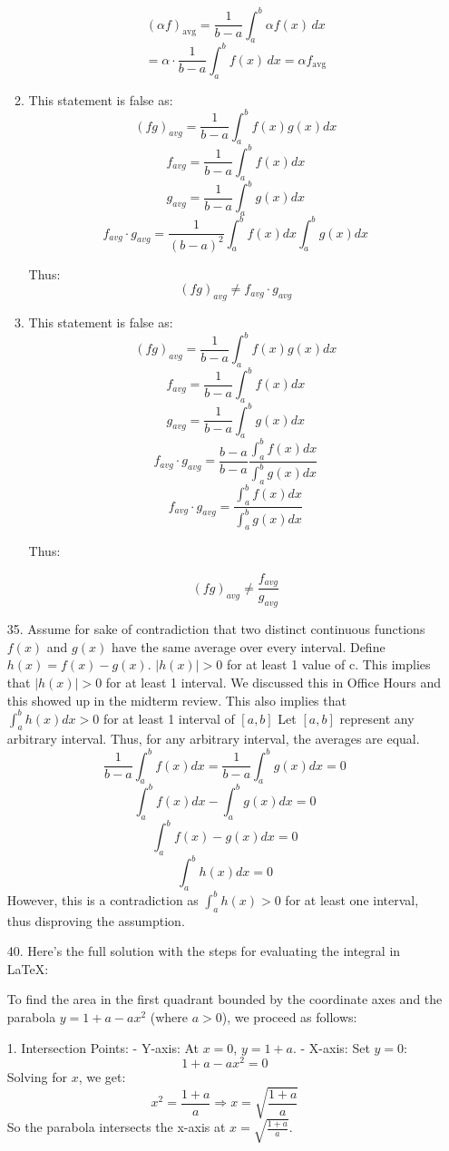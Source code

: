 \documentclass[12pt]{article}
\begin{document}
\begin{enumerate}[start=1,label={\bfseries. },leftmargin=1in]
\begin{enumerate}
\[
(\alpha f)_{\text{avg}} = \frac{1}{b - a} \int_a^b \alpha f(x) \, dx 
\]
\[
= \alpha \cdot \frac{1}{b - a} \int_a^b f(x) \, dx = \alpha f_{\text{avg}}
\]

\item This statement is false as:
\[
(fg)_{avg} = \frac{1}{b - a} \int_a^b f(x) g(x)dx
\]
\[
f_{avg} = \frac{1}{b - a} \int_a^b f(x)dx
\]
\[
g_{avg} = \frac{1}{b - a} \int_a^b g(x)dx
\]
\[
f_{avg}\cdot g_{avg} = \frac{1}{(b-a)^2}\int_a^b f(x)dx\int_a^b g(x)dx
\]

Thus: 
\[
(fg)_{avg} \neq f_{avg}\cdot g_{avg}
\]


\item This statement is false as:
\[
(fg)_{avg} = \frac{1}{b - a} \int_a^b f(x) g(x)dx
\]
\[
f_{avg} = \frac{1}{b - a} \int_a^b f(x)dx
\]
\[
g_{avg} = \frac{1}{b - a} \int_a^b g(x)dx
\]
\[
f_{avg}\cdot g_{avg} = \frac{b-a}{b-a}\frac{\int_a^b f(x)dx}{\int_a^b g(x)dx}
\]
\[
f_{avg}\cdot g_{avg} = \frac{\int_a^b f(x)dx}{\int_a^b g(x)dx}
\]

Thus:

\[
(fg)_{avg} \neq \frac{f_{avg}}{g_{avg}}
\]


\end{enumerate}

\item [35. ]
Assume for sake of contradiction that two distinct continuous functions $f(x)$ and $g(x)$ have the same average over every interval. Define $h(x) = f(x) - g(x)$. $|h(x)| > 0$ for at least 1 value of c. This implies that $|h(x)| > 0 $ for at least 1 interval. We discussed this in Office Hours and this showed up in the midterm review. This also implies that $\int_{a}^b h(x)dx > 0$ for at least 1 interval of $[a,b]$
Let $[a,b]$ represent any arbitrary interval. Thus, for any arbitrary interval, the averages are equal. 
\[
\frac{1}{b-a}\int_a^bf(x)dx = \frac{1}{b-a}\int_a^bg(x)dx = 0
\]
\[
\int_a^bf(x)dx - \int_a^bg(x)dx = 0
\]
\[
\int_a^b f(x) - g(x) dx = 0
\]
\[
\int_a^bh(x) dx= 0
\]
However, this is a contradiction as $\int_{a}^b h(x) > 0$ for at least one interval, thus disproving the assumption.

\item [40. ]
Here’s the full solution with the steps for evaluating the integral in LaTeX:

To find the area in the first quadrant bounded by the coordinate axes and the parabola \( y = 1 + a - ax^2 \) (where \( a > 0 \)), we proceed as follows:

1. Intersection Points:
   - Y-axis: At \( x = 0 \), \( y = 1 + a \).
   - X-axis: Set \( y = 0 \):
     \[
     1 + a - ax^2 = 0
     \]
     Solving for \( x \), we get:
     \[
     x^2 = \frac{1 + a}{a} \Rightarrow x = \sqrt{\frac{1 + a}{a}}
     \]
   So the parabola intersects the x-axis at \( x = \sqrt{\frac{1 + a}{a}} \).


\end{enumerate}
\end{document}
